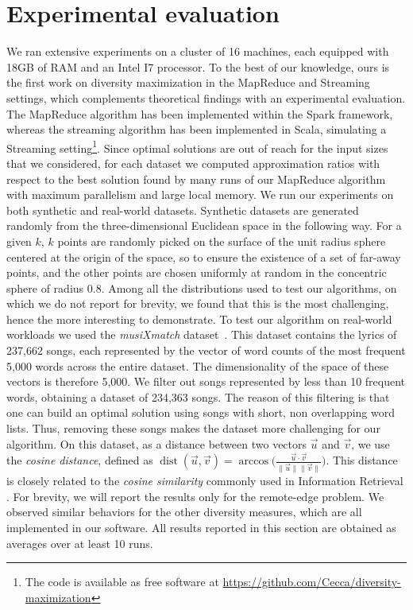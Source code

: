 \documentclass{article}
\newcommand{\dist}{\operatorname{dist}}
\begin{document}
\section{Experimental evaluation}
\label{sec:experiments}
We ran extensive experiments on a cluster of 16 machines, each
equipped with 18GB of RAM and an Intel I7 processor.
To the best of our knowledge, ours is the first work on diversity
maximization in the MapReduce and Streaming settings, which
complements theoretical findings with an experimental evaluation.
The MapReduce algorithm has been implemented within the Spark
framework, whereas the streaming algorithm has been implemented in
Scala, simulating a Streaming setting\footnote{The code is available
  as free software at \url{https://github.com/Cecca/diversity-maximization}}.
Since optimal solutions are out of reach for the input sizes that we
considered, for each dataset we computed approximation ratios with
respect to the best solution found by many runs of our MapReduce
algorithm with maximum parallelism and large local memory.
We run our experiments on both synthetic and real-world datasets.
Synthetic datasets are generated randomly from the three-dimensional
Euclidean space in the following way.  For a given $k$, $k$ points are
randomly picked on the surface of the unit radius sphere centered at
the origin of the space, so to ensure the existence of a set of
far-away points, and the other points are chosen uniformly at random
in the concentric sphere of radius 0.8. Among all the distributions
used to test our algorithms, on which we do not report for brevity, we found that this is the most challenging, hence the more
interesting to demonstrate.
To test our algorithm on real-world workloads we used the
\emph{musiXmatch} dataset~\cite{BertinM11}.  This dataset contains
the lyrics of 237,662 songs, each represented by the vector of word
counts of the most frequent 5,000 words across the entire dataset.  The
dimensionality of the space of these vectors is therefore 5,000.  We
filter out songs represented by less than 10 frequent words, obtaining
a dataset of 234,363 songs.  The reason of this filtering is that one
can build an optimal solution using songs with short, non overlapping
word lists. Thus, removing these songs makes the dataset more challenging
for our algorithm.  On this dataset, as a distance between two vectors
$\vec{u}$ and $\vec{v}$, we use the \emph{cosine distance}, defined as
$\dist(\vec{u}, \vec{v}) = \arccos\big(\frac{\vec{u} \cdot
  \vec{v}}{\|\vec{u}\| \|\vec{v}\|}\big)$. This distance is closely
related to the \emph{cosine similarity} commonly used in Information
Retrieval \cite{LeskovecRU14}.
For brevity, we will report the results only for the remote-edge
problem.  We observed similar behaviors for the other diversity
measures, which are all implemented in our software.  All results
reported in this section are obtained as averages over at least 10
runs.
\end{document}
